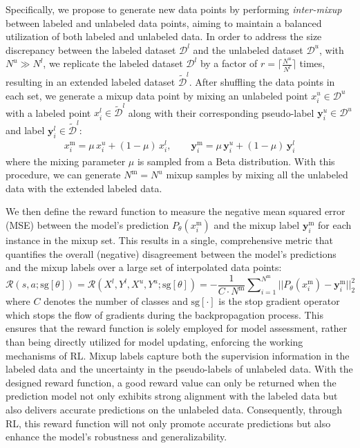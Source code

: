 Specifically, we propose to generate new data points by performing {\em inter-mixup} 
between labeled and unlabeled data points,
aiming to maintain a balanced utilization of both labeled and unlabeled data. 
In order to address the size discrepancy between the labeled dataset $\mathcal{D}^l$ and 
the unlabeled dataset $\mathcal{D}^u$, with $N^u \gg N^l$, 
we replicate the labeled dataset $\mathcal{D}^l$ by a factor of 
$r = \lceil\frac{N^u}{N^l}\rceil$ times, 
resulting in an extended labeled dataset $\widetilde{\mathcal{D}}^l$.
After shuffling the data points in each set, 
we generate a mixup data point by mixing an unlabeled point 
$x_i^u \in \mathcal{D}^u$ with a labeled point $x_i^l \in \widetilde{\mathcal{D}}^l$ 
along with their corresponding pseudo-label ${\mathbf{y}^u_i} \in \mathcal{D}^u$ and 
label ${\mathbf{y}^l_i} \in \widetilde{\mathcal{D}}^l$:
\begin{equation}
\begin{gathered}
x_i^{\text{m}}=\mu\,x_i^u+(1-\mu)\,x^l_i,\qquad 
{\mathbf{y}}_i^{\text{m}}=\mu\,{\mathbf{y}}_i^u + (1-\mu)\,{\mathbf{y}}_i^l
\end{gathered}
\label{eq:mix}
\end{equation}
where the mixing parameter $\mu$ is sampled from a Beta distribution.
With this procedure, we can generate 
$N^{\text{m}}=N^u$ mixup samples
by mixing all the unlabeled data with the extended labeled data.  

We then define the reward function to measure the negative mean squared error (MSE) 
between the model's prediction $P_\theta(x_i^{\text{m}})$ and the mixup label $\mathbf{y}_i^{\text{m}}$ 
for each instance in the mixup set. 
This results in a single, comprehensive metric that quantifies the overall (negative) 
disagreement between the model's predictions and the mixup labels over a large set of interpolated data points:
\begin{equation}
\mathcal{R}(s, a;\text{sg}[\theta]) =
\mathcal{R}(X^l, Y^l, X^u, Y^u;\text{sg}[\theta]) 
	= - \frac{1 }{C\cdot N^\text{m} }\sum\nolimits_{i=1}^{N^\text{m}} ||P_{\theta}(x_i^{\text{m}})-\mathbf{y}_i^{\text{m}}||^2_2
\label{eq:reward}
\end{equation}
where $C$ denotes the number of classes and $\text{sg}[\cdot]$ is the stop gradient operator 
which stops the flow of gradients during the backpropagation process. 
This ensures that the reward function is solely employed for model assessment, 
rather than being directly utilized for model updating, 
enforcing the working mechanisms of RL. 
Mixup labels capture both the supervision information in the labeled data
and the uncertainty in the pseudo-labels of unlabeled data. 
With the designed reward function, a good reward value can only be returned 
when the prediction model not only exhibits strong alignment with the labeled data 
but also delivers accurate predictions on the unlabeled data. 
Consequently, through RL, this reward function will 
not only promote accurate predictions but also enhance the model's robustness and generalizability.

